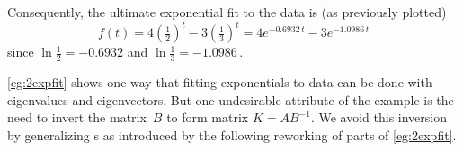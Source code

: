 \begin{example}
\begin{solution}
Consequently, the ultimate exponential fit to the data is (as previously plotted)
\begin{equation*}
f(t)=4(\tfrac12)^t-3(\tfrac13)^t
=4e^{-0.6932\,t}-3e^{-1.0986\,t}
\end{equation*}
since \(\ln\frac12=-0.6932\) and \(\ln \frac13=-1.0986\)\,.
\end{solution}
\end{example}
\endgroup


\cref{eg:2expfit} shows one way that fitting exponentials to data can be done with eigenvalues and eigenvectors.
But one undesirable attribute of the example is the need to invert the matrix~\(B\) to form matrix \(K=AB^{-1}\).
We avoid this inversion by generalizing s as introduced by the following reworking of parts of \cref{eg:2expfit}.


